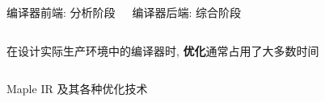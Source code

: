 \begin{frame}{}
  \begin{columns}
      \begin{center}
        编译器前端: 分析阶段
      \end{center}
      \begin{center}
        编译器后端: 综合阶段
      \end{center}
  \end{columns}
\end{frame}

\begin{frame}{}
  \begin{center}
  \end{center}

  \begin{columns}
  \end{columns}

  \vspace{0.30cm}
  \begin{center}
    在设计实际生产环境中的编译器时, {\bf 优化}通常占用了大多数时间
  \end{center}
\end{frame}

\begin{frame}{}
  \begin{columns}
  \end{columns}

  \vspace{0.50cm}
  \begin{center}
    Maple IR 及其各种优化技术
  \end{center}
\end{frame}

